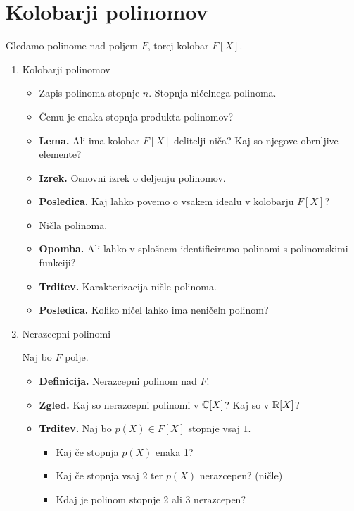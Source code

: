 \section{Kolobarji polinomov}

Gledamo polinome nad poljem \(F\), torej kolobar \(F[X]\).
\begin{enumerate}
    \item Kolobarji polinomov
    \begin{itemize}
        \item Zapis polinoma stopnje \(n\). Stopnja ničelnega polinoma.
        \item Čemu je enaka stopnja produkta polinomov?
        \item \textbf{Lema.} Ali ima kolobar \(F[X]\) delitelji niča? Kaj so njegove obrnljive elemente?
        \item \textbf{Izrek.} Osnovni izrek o deljenju polinomov.
        \item \textbf{Posledica.} Kaj lahko povemo o vsakem idealu v kolobarju \(F[X]\)?
        \item Ničla polinoma.
        \item \textbf{Opomba.} Ali lahko v splošnem identificiramo polinomi s polinomskimi funkciji?
        \item \textbf{Trditev.} Karakterizacija ničle polinoma.
        \item \textbf{Posledica.} Koliko ničel lahko ima neničeln polinom?
    \end{itemize}

    \item Nerazcepni polinomi
    
    Naj bo \(F\) polje.
    \begin{itemize}
        \item \textbf{Definicija.} Nerazcepni polinom nad \(F\).
        \item \textbf{Zgled.} Kaj so nerazcepni polinomi v \(\mathbb{C}[X]\)? Kaj so v \(\mathbb{R}[X]\)?
        \item \textbf{Trditev.} Naj bo \(p(X) \in F[X]\) stopnje vsaj \(1\).
        \begin{itemize}
            \item Kaj če stopnja \(p(X)\) enaka 1?
            \item Kaj če stopnja vsaj 2 ter \(p(X)\) nerazcepen? (ničle)
            \item Kdaj je polinom stopnje 2 ali 3 nerazcepen?
        \end{itemize}
    \end{itemize}


\end{enumerate}
